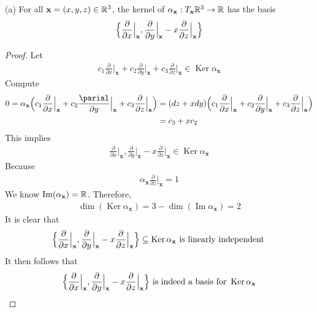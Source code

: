 \documentclass{report}
\begin{document}
\begin{theorem}
  (a) For all $\textbf{x}=(x,y,z)\in \mathbb{R}^3$, the kernel of $\alpha _{\textbf{x}}:T_\textbf{x}\mathbb{R}^3 \rightarrow \mathbb{R}$ has the basis 
\begin{align*}
\Big\{ \frac{\partial }{\partial x}\Big|_{\textbf{x}}, \frac{\partial }{\partial y}\Big|_{\textbf{x}}-x \frac{\partial }{\partial z}\Big|_{\textbf{x}} \Big\}
\end{align*}
\end{theorem}
\begin{proof}
Let 
\begin{align*}
 c_1\frac{\partial }{\partial x}\Big|_{\textbf{x}}+c_2 \frac{\partial }{\partial y}\Big|_{\textbf{x}}+ c_3\frac{\partial }{\partial z}\Big|_{\textbf{x}} \in \operatorname{Ker}\alpha _\textbf{x}
\end{align*}
Compute 
\begin{align*}
0=\alpha_{\textbf{x}}\Big( c_1\frac{\partial }{\partial x}\Big|_{\textbf{x}}+c_2 \frac{\parial }{\partial y}\Big|_{\textbf{x}}+ c_3\frac{\partial }{\partial z}\Big|_{\textbf{x}}  \Big)&=  (dz+xdy) \Big( c_1\frac{\partial }{\partial x}\Big|_{\textbf{x}}+c_2 \frac{\partial }{\partial y}\Big|_{\textbf{x}}+ c_3\frac{\partial }{\partial z}\Big|_{\textbf{x}}  \Big) \\
&= c_3 + x c_2
\end{align*}
This implies 
\begin{align*}
\frac{\partial }{\partial x}\Big|_{\textbf{x}}, \frac{\partial }{\partial y}\Big|_{\textbf{x}}-x \frac{\partial }{\partial z}\Big|_{\textbf{x}} \in \operatorname{Ker}\alpha_{\textbf{x}}
\end{align*}
Because 
\begin{align*}
\alpha_{\textbf{x}} \frac{\partial }{\partial z}\Big|_{\textbf{x}} =1
\end{align*}
We know $\operatorname{Im}(\alpha_{\textbf{x}})=\mathbb{R}$. Therefore, 
\begin{align*}
\operatorname{dim}(\operatorname{Ker}\alpha_{\textbf{x}})=3- \operatorname{dim}(\operatorname{Im}\alpha _{\textbf{x}})= 2
\end{align*}
It is clear that 
\begin{align*}
  \Big\{ \frac{\partial }{\partial x}\Big|_{{\textbf{x}}}, \frac{\partial }{\partial y}\Big|_{\textbf{x}}-x \frac{\partial }{\partial z}\Big|_{\textbf{x}} \Big\}\subseteq \operatorname{Ker}\alpha _\textbf{x}\text{ is linearly independent }
\end{align*}
It then follows that 
\begin{align*}
  \Big\{ \frac{\partial }{\partial x}\Big|_{\textbf{x}}, \frac{\partial }{\partial y}\Big|_{\textbf{x}}-x \frac{\partial }{\partial z}\Big|_{\textbf{x}} \Big\} \text{ is indeed a basis for }\operatorname{Ker}\alpha _{\textbf{x}}
\end{align*}
\end{proof}
\end{document}
